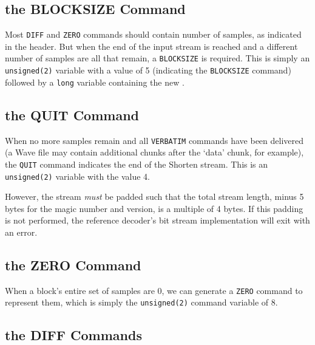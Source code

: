 \subsection{the BLOCKSIZE Command}

Most \texttt{DIFF} and \texttt{ZERO} commands should contain
 number of samples, as indicated in the header.
But when the end of the input stream is reached and a different
number of samples are all that remain, a \texttt{BLOCKSIZE}
is required.
This is simply an \texttt{unsigned(2)} variable with a value of 5
(indicating the \texttt{BLOCKSIZE} command)
followed by a \texttt{long} variable containing the new .

\subsection{the QUIT Command}

When no more samples remain and all \texttt{VERBATIM} commands have
been delivered (a Wave file may contain additional chunks after
the `data' chunk, for example), the \texttt{QUIT} command indicates
the end of the Shorten stream.
This is an \texttt{unsigned(2)} variable with the value 4.

However, the stream \textit{must} be padded such that the total
stream length, minus 5 bytes for the magic number and version,
is a multiple of 4 bytes.
If this padding is not performed, the reference decoder's bit stream
implementation will exit with an error.

\subsection{the ZERO Command}

When a block's entire set of samples are 0, we can generate
a \texttt{ZERO} command to represent them, which is
simply the \texttt{unsigned(2)} command variable of 8.

\pagebreak

\subsection{the DIFF Commands}


